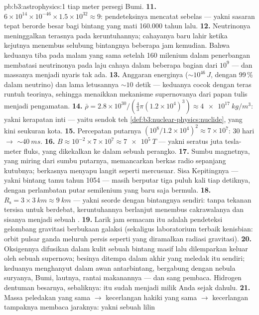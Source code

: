\begin{solution}{pb:b3:astrophysics:1}
tiap meter persegi Bumi.
\textbf{11.} $6\times10^{14}\times10^{-46}\times1.5\times
10^{32} \approx 9$: pendeteksinya mencatat sebelas --- yakni
sasaran tepat berorde besar bagi bintang yang mati 160.000 tahun
lalu.
\textbf{12.} Neutrinonya meninggalkan terasnya pada keruntuhannya;
cahayanya baru lahir ketika kejutnya menembus selubung
bintangnya beberapa jam kemudian. Bahwa keduanya tiba pada malam yang sama setelah
160 milenium dalam penerbangan membatasi neutrinonya pada laju cahaya
dalam beberapa bagian dari $10^{9}$ --- dan massanya menjadi nyaris tak ada.
\textbf{13.} Anggaran energinya ($\sim10^{46}\,\unit{J}$, dengan 99\,\%
dalam neutrino) dan lama letusannya ${\sim}10$ detik ---
keduanya cocok dengan teras runtuh teorinya, sehingga menaikkan
mekanisme supernovanya dari papan tulis menjadi pengamatan.
\textbf{14.} $\bar\rho = 2.8\times10^{30}/(\tfrac43\pi
(1.2\times10^4)^3) \approx \qty{4e17}{kg/m^3}$: yakni kerapatan
inti --- yaitu sendok teh \cref{def:b3:nuclear-physics:nuclide},
yang kini seukuran kota.
\textbf{15.} Percepatan putarnya $(10^8/1.2\times10^4)^2 \approx
7\times10^{7}$: 30 hari $\to$ ${\sim}\qty{40}{ms}$.
\textbf{16.} $B \approx 10^{-2}\times7\times10^{7} \approx
\qty{7e5}{T}$ --- yakni seratus juta tesla-meter fluks,
yang dikekalkan ke dalam sebuah perangko.
\textbf{17.} Sumbu magnetnya, yang miring dari sumbu putarnya,
memancarkan berkas radio sepanjang kutubnya; berkasnya menyapu langit seperti
mercusuar. Sisa Kepitingnya --- yakni bintang tamu tahun 1054 --- masih
berputar tiga puluh kali tiap detiknya, dengan perlambatan putar semilenium yang
baru saja bermula.
\textbf{18.} $R_{\text{s}} = 3\times\qty{3}{km} \approx
\qty{9}{km}$ --- yakni seorde dengan bintangnya sendiri: tanpa
tekanan tersisa untuk berdebat, keruntuhannya berlanjut menembus cakrawalanya
dan sisanya menjadi sebuah .
\textbf{19.} Larik jam semacam itu adalah pendeteksi gelombang gravitasi
berbukaan galaksi (sekaligus laboratorium terbaik kenisbian:
orbit pulsar ganda meluruh persis seperti yang diramalkan radiasi
gravitasi).
\textbf{20.} Oksigennya difusikan dalam kulit sebuah bintang masif
lalu dilemparkan keluar oleh sebuah supernova; besinya ditempa dalam
akhir yang meledak itu sendiri; keduanya menghanyut dalam awan antarbintang,
bergabung dengan nebula suryanya, Bumi, lautnya, rantai makanannya
--- dan sang pembaca. Hidrogen dentuman besarnya, sebaliknya: itu sudah
menjadi milik Anda sejak dahulu.
\textbf{21.} Massa peledakan yang sama $\to$ kecerlangan hakiki
yang sama $\to$ kecerlangan tampaknya membaca jaraknya: yakni sebuah lilin

\end{solution}
